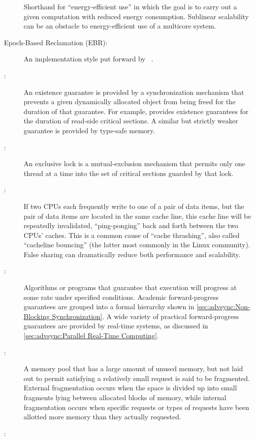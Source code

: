 \begin{description}
	Shorthand for ``energy-efficient use'' in which the goal is to
	carry out a given computation with reduced energy consumption.
	Sublinear scalability can be an obstacle to energy-efficient use
	of a multicore system.
\item[Epoch-Based Reclamation (EBR):]
	An  implementation style put forward by
	~\cite{KeirAnthonyFraserPhD,UCAM-CL-TR-579,KeirFraser2007withoutLocks}.
\item[\IXG{Existence Guarantee}:]
	An existence guarantee is provided by a synchronization mechanism
	that prevents a given dynamically allocated object from being
	freed for the duration of that guarantee.
	For example,  provides existence guarantees for the duration
	of  read-side critical sections.
	A similar but strictly weaker guarantee is provided by
	type-safe memory.
\item[\IXGh{Exclusive}{Lock}:]
	An exclusive lock is a mutual-exclusion mechanism that
	permits only one thread at a time into the
	set of critical sections guarded by that lock.
\item[\IXG{False Sharing}:]
	If two CPUs each frequently write to one of a pair of data items,
	but the pair of data items are located in the same cache line,
	this cache line will be repeatedly invalidated, ``ping-ponging''
	back and forth between the two CPUs' caches.
	This is a common cause of ``cache thrashing'', also called
	``cacheline bouncing'' (the latter most commonly in the Linux
	community).
	False sharing can dramatically reduce both performance and
	scalability.
\item[\IXG{Forward-Progress Guarantee}:]
	Algorithms or programs that guarantee that execution will
	progress at some rate under specified conditions.
	Academic forward-progress guarantees are grouped into a
	formal hierarchy shown in
	\cref{sec:advsync:Non-Blocking Synchronization}.
	A wide variety of practical forward-progress guarantees are
	provided by real-time systems, as discussed in
	\cref{sec:advsync:Parallel Real-Time Computing}.
\item[\IXG{Fragmentation}:]
	A memory pool that has a large amount of unused memory, but
	not laid out to permit satisfying a relatively small request
	is said to be fragmented.
	External fragmentation occurs when the space is divided up
	into small fragments lying between allocated blocks of memory,
	while internal fragmentation occurs when specific requests or
	types of requests have been allotted more memory than they
	actually requested.
\item[\IXGh{Fully Associative}{Cache}:]

\end{description}
